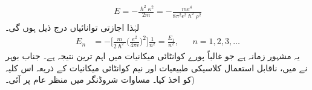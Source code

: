  \begin{align}
E=-\frac{\hslash^{2}\kappa ^{2}}{2m}=-\frac{me^{4}}{8\pi^{2}\epsilon^{2}\hslash^{2}\rho^{2}} 
\end{align}
 لہٰذا اجازتی توانائیاں درج ذیل ہوں گی۔ 
 \begin{align}\label{مساوات_ابعادی_ہائیڈروجن_اجازتی_توانائیاں}
E_{n}&=-\big[\frac{m}{2\hslash^{2}}\big(\frac{e^{2}}{4\pi\epsilon}\big)^{2}\big]\frac{1}{n^{2}}=\frac{E_{1}}{n^{2}}, && n=1,2,3,\dotsc
\end{align}
 یہ مشہور  زمانہ  ہے جو غالباً پورے کوانٹائی  میکانیات میں  اہم ترین نتیجہ ہے۔ جناب بوہر نے  میں،  ناقابل استعمال کلاسیکی طبیعیات اور نیم کوانٹائی میکانیات کے ذریعہ  اس کلیہ  کو  اخذ کیا۔ مساوات شروڈنگر  میں منظر عام  پر آئی۔)

